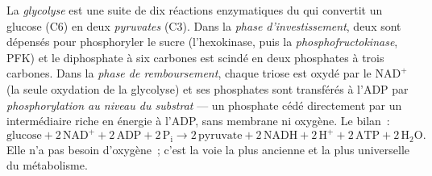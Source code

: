 \begin{definition}[Glycolyse]\label{def:b1:respiration-fermentation:glycolysis}
La \emph{glycolyse} est une suite de dix réactions enzymatiques du
 qui convertit un glucose (C6) en deux \emph{pyruvates} (C3).
Dans la \emph{phase d'investissement}, deux  sont dépensés pour
phosphoryler le sucre (l'hexokinase, puis la
\emph{phosphofructokinase}, PFK) et le diphosphate à six carbones est
scindé en deux phosphates à trois carbones. Dans la \emph{phase de
remboursement}, chaque triose est oxydé par le $\mathrm{NAD^+}$ (la
seule oxydation de la glycolyse) et ses phosphates sont transférés à
l'ADP par \emph{phosphorylation au niveau du substrat} --- un phosphate cédé directement par un
intermédiaire riche en énergie à l'ADP, sans membrane ni oxygène. Le
bilan~:
\[
\text{glucose} + 2\,\mathrm{NAD^+} + 2\,\mathrm{ADP} + 2\,\mathrm{P_i}
\to 2\,\text{pyruvate} + 2\,\mathrm{NADH} + 2\,\mathrm{H^+} + 2\,\mathrm{ATP} + 2\,\mathrm{H_2O} .
\]
Elle n'a pas besoin d'oxygène~; c'est la voie la plus ancienne et la
plus universelle du métabolisme.
\end{definition}

